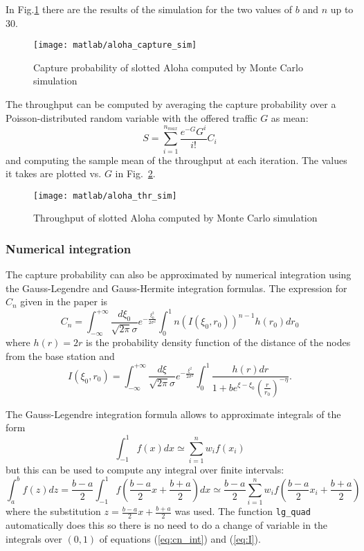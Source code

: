 \documentclass[a4paper,oneside]{article}
\newcommand{\inlinecode}[1]{\lstinline[basicstyle=\ttfamily,keywordstyle={},stringstyle={},commentstyle={\itshape}]{#1}}
\renewcommand{\approx}[0]{\simeq}
\begin{document}
In Fig.\ref{plot:aloha_capture_sim} there are the results of the
simulation for the two values of $b$ and $n$ up to 30.
\begin{figure}[htbp]
  \centering
  \texttt{[image: matlab/aloha\_capture\_sim]}
  \caption{Capture probability of slotted Aloha computed by Monte
    Carlo simulation}
  \label{plot:aloha_capture_sim}
\end{figure}

The throughput can be computed by averaging the capture probability
over a Poisson-distributed random variable with the offered traffic
$G$ as mean:
\begin{equation}
  S = \sum_{i=1}^{n_{max}} \frac{e^{-G} G^i}{i!} C_i
\end{equation}
and computing the sample mean of the throughput at each iteration.
The values it takes are plotted vs. $G$ in
Fig.~\ref{plot:aloha_thr_sim}.
\begin{figure}[htbp]
  \centering
  \texttt{[image: matlab/aloha\_thr\_sim]}
  \caption{Throughput of slotted Aloha computed by Monte Carlo
    simulation}
  \label{plot:aloha_thr_sim}
\end{figure}

\subsubsection*{Numerical integration}
The capture probability can also be approximated by numerical
integration using the Gauss-Legendre and Gauss-Hermite integration
formulas. The expression for $C_n$ given in the paper is
\begin{equation}
  C_n = \int_{-\infty}^{+\infty} \frac{d\xi_0}{\sqrt{2\pi}\sigma} e^{-\frac{\xi_0^2}{2\sigma^2}}
  \int_0^1 n\left( I(\xi_0, r_0) \right)^{n-1} h(r_0)dr_0
  \label{eq:cn_int}
\end{equation}
where $h(r) = 2r$ is the probability density function of the distance of
the nodes from the base station and
\begin{equation}
  I(\xi_0, r_0) = \int_{-\infty}^{+\infty} \frac{d\xi}{\sqrt{2\pi}\sigma} e^{-\frac{\xi^2}{2\sigma^2}}
  \int_0^1 \frac{h(r)dr}{1 + be^{\xi - \xi_0}\left( \frac{r}{r_0} \right)^{-\eta}} .
  \label{eq:I}
\end{equation}

The Gauss-Legendre integration formula allows to approximate integrals
of the form
\begin{equation}
  \int_{-1}^1 f(x) dx \approx \sum_{i=1}^n w_i f(x_i)
\end{equation}
but this can be used to compute any integral over finite intervals:
\begin{equation}
  \int_a^b f(z) dz = \frac{b-a}{2}\int_{-1}^1 f\left( \frac{b-a}{2} x + \frac{b+a}{2} \right) dx \approx \frac{b-a}{2} \sum_{i=1}^n w_i f\left( \frac{b-a}{2} x_i + \frac{b+a}{2} \right)
\end{equation}
where the substitution $z = \frac{b-a}{2} x + \frac{b+a}{2}$ was used.
The function \inlinecode{lg_quad} automatically does this so there is
no need to do a change of variable in the integrals over $(0,1)$ of
equations (\ref{eq:cn_int}) and (\ref{eq:I}).
\end{document}
